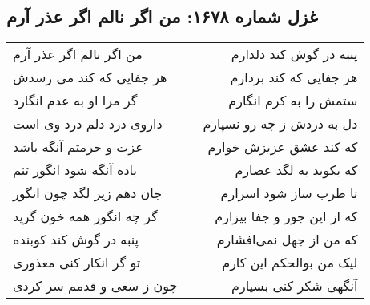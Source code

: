 \begin{center}
\section*{غزل شماره ۱۶۷۸: من اگر نالم اگر عذر آرم}
\label{sec:1678}
\begin{longtable}{l p{0.5cm} r}
من اگر نالم اگر عذر آرم
&&
پنبه در گوش کند دلدارم
\\
هر جفایی که کند می رسدش
&&
هر جفایی که کند بردارم
\\
گر مرا او به عدم انگارد
&&
ستمش را به کرم انگارم
\\
داروی درد دلم درد وی است
&&
دل به دردش ز چه رو نسپارم
\\
عزت و حرمتم آنگه باشد
&&
که کند عشق عزیزش خوارم
\\
باده آنگه شود انگور تنم
&&
که بکوبد به لگد عصارم
\\
جان دهم زیر لگد چون انگور
&&
تا طرب ساز شود اسرارم
\\
گر چه انگور همه خون گرید
&&
که از این جور و جفا بیزارم
\\
پنبه در گوش کند کوبنده
&&
که من از جهل نمی‌افشارم
\\
تو گر انکار کنی معذوری
&&
لیک من بوالحکم این کارم
\\
چون ز سعی و قدمم سر کردی
&&
آنگهی شکر کنی بسیارم
\\
\end{longtable}
\end{center}
